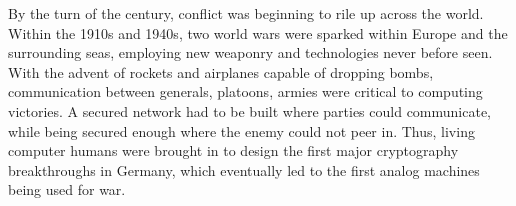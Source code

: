 \documentclass[../computer-history.tex]{subfiles}
\begin{document}
By the turn of the century, conflict was beginning to rile up across the world. Within the 1910s and 1940s, two world wars were sparked within
Europe and the surrounding seas, employing new weaponry and technologies never before seen. With the advent of rockets and airplanes capable of dropping bombs,
communication between generals, platoons, armies were critical to computing victories. A secured network had to be built where parties could communicate,
while being secured enough where the enemy could not peer in. Thus, living computer humans were brought in to design the first major cryptography breakthroughs in Germany,
which eventually led to the first analog machines being used for war\cite{cmphistory}.

\Blindtext

\biblio
\end{document}
